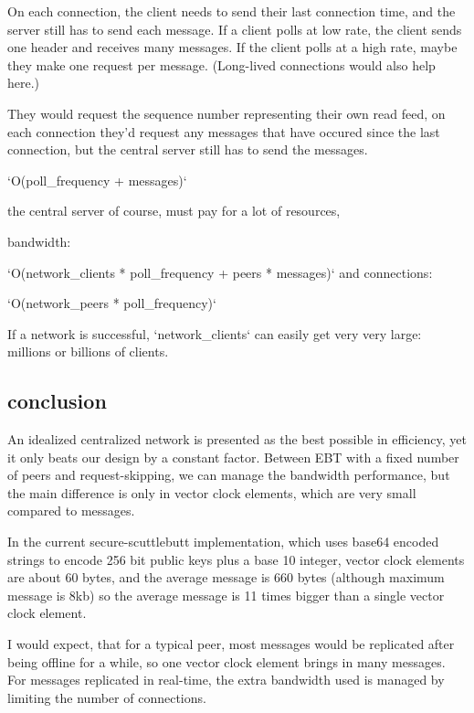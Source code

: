 \documentclass[sigconf]{acmart}
\begin{document}
On each connection, the client needs to send their last connection
time, and the server still has to send each message. If a client polls
at low rate, the client sends one header and receives many
messages. If the client polls at a high rate, maybe they make one
request per message. (Long-lived connections would also help here.)

They would request the sequence number representing their own read
feed, on each connection they'd request any messages that have occured
since the last connection, but the central server still has to send
the messages.

`O(poll\_frequency + messages)`

the central server of course, must pay for a lot of resources,

bandwidth:

`O(network\_clients * poll\_frequency + peers * messages)`
and connections:

`O(network\_peers * poll\_frequency)`

If a network is successful, `network\_clients` can easily get very very
large: millions or billions of clients.

\subsection{conclusion}

An idealized centralized network is presented as the best possible in
efficiency, yet it only beats our design by a constant factor. Between
EBT with a fixed number of peers and request-skipping, we can manage
the bandwidth performance, but the main difference is only in vector
clock elements, which are very small compared to messages.

In the current secure-scuttlebutt implementation, which uses base64
encoded strings to encode 256 bit public keys plus a base 10 integer,
vector clock elements are about 60 bytes, and the average message is
660 bytes (although maximum message is 8kb) so the average message is
11 times bigger than a single vector clock element.

I would expect, that for a typical peer, most messages would be
replicated after being offline for a while, so one vector clock
element brings in many messages. For messages replicated in real-time,
the extra bandwidth used is managed by limiting the number of
connections.
\end{document}
